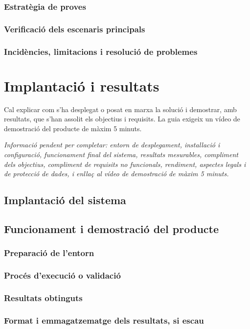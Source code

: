 \documentclass[11pt,a4paper]{article}
\newcommand{\requiredinfo}[1]{%
  \vspace{0.4em}%
  {\color{placeholdergray}\textit{Informaci\'o pendent per completar: #1.}}\par
}
\newcommand{\sectionintro}[1]{%
  \vspace{0.25em}%
  #1\par
}
\begin{document}
\subsubsection{Estrat\`egia de proves}
\subsubsection{Verificaci\'o dels escenaris principals}
\subsubsection{Incid\`encies, limitacions i resoluci\'o de problemes}

\section{Implantaci\'o i resultats}
\sectionintro{Cal explicar com s'ha desplegat o posat en marxa la soluci\'o i demostrar, amb resultats, que s'han assolit els objectius i requisits. La guia exigeix un v\'ideo de demostraci\'o del producte de m\`axim 5 minuts.}
\requiredinfo{entorn de desplegament, instal\textperiodcentered laci\'o i configuraci\'o, funcionament final del sistema, resultats mesurables, compliment dels objectius, compliment de requisits no funcionals, rendiment, aspectes legals i de protecci\'o de dades, i enlla\c{c} al v\'ideo de demostraci\'o de m\`axim 5 minuts}

\subsection{Implantaci\'o del sistema}
\subsection{Funcionament i demostraci\'o del producte}
\subsubsection{Preparaci\'o de l'entorn}
\subsubsection{Proc\'es d'execuci\'o o validaci\'o}
\subsubsection{Resultats obtinguts}
\subsubsection{Format i emmagatzematge dels resultats, si escau}
\end{document}
